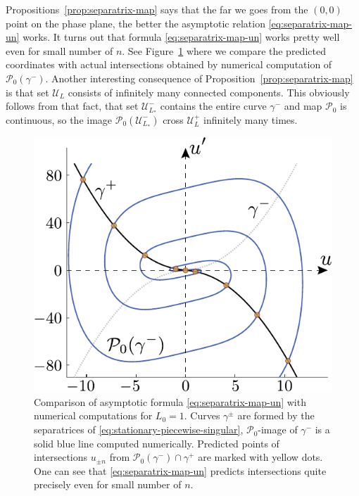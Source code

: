 Propositions~\ref{prop:separatrix-map} says that the far we goes from the $(0, 0)$ point on the phase plane, the better the asymptotic relation \eqref{eq:separatrix-map-un} works.
It turns out that formula \eqref{eq:separatrix-map-un} works pretty well even for small number of $n$.
See Figure~\ref{fig:separatrix-map-with-numerical-computations} where we compare the predicted coordinates with actual intersections obtained by numerical computation of $\mathcal{P}_0(\gamma^-)$.
Another interesting consequence of Proposition~\ref{prop:separatrix-map} is that set $\mathscr{U}_{L}$ consists of infinitely many connected components.
This obviously follows from that fact, that set $\mathscr{U}_{L_*}^-$ contains the entire curve $\gamma^-$ and map $\mathcal{P}_0$ is continuous, so the image $\mathcal{P}_0 (\mathscr{U}_{L_*}^-)$ cross $\mathscr{U}_{L}^+$ infinitely many times.
\begin{figure}[h]
\centering
	\includegraphics[scale = 1]{pic/separatrix map with numerical computations}
	\caption{
		Comparison of asymptotic formula \eqref{eq:separatrix-map-un} with numerical computations for $L_0 = 1$.
		Curves $\gamma^{\pm}$ are formed by the separatrices of \eqref{eq:stationary-piecewise-singular}, $\mathcal{P}_0$-image of $\gamma^-$ is a solid blue line computed numerically.
		Predicted points of intersections $u_{\pm n}$ from $\mathcal{P}_0(\gamma^-) \cap \gamma^+$ are marked with yellow dots. One can see that \eqref{eq:separatrix-map-un} predicts intersections quite precisely even for small number of $n$.
	}
\label{fig:separatrix-map-with-numerical-computations}
\end{figure}

